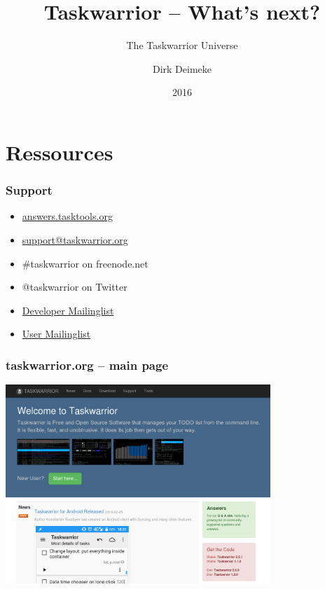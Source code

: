 \documentclass[t,handout]{beamer}
\title{Taskwarrior -- What's next?}
\subtitle{The Taskwarrior Universe}
\author[Deimeke, Dirk]{Dirk Deimeke}
\institute[Taskwarrior Academy]{Taskwarrior Academy}
\date{2016}
\begin{document}
\begin{frame} %
	\titlepage
\end{frame}



\section{Ressources}

\begin{frame}\frametitle{Support}
    \begin{itemize}
        \item \href{https://answers.tasktools.org/}{answers.tasktools.org}
        \item \href{mailto:support@taskwarrior.org}{support@taskwarrior.org}
        \item \#taskwarrior on freenode.net
        \item @taskwarrior on Twitter
        \item \href{https://groups.google.com/forum/\#!forum/taskwarrior-dev}{Developer Mailinglist}
        \item \href{https://groups.google.com/forum/\#!forum/taskwarrior-user}{User Mailinglist}
    \end{itemize}
\end{frame}

\begin{frame}\frametitle{taskwarrior.org -- main page}
    \begin{center}
        \href{http://taskwarrior.org}{\includegraphics[width=10cm,height=7.5cm]{taskwarrior-org.png}}
    \end{center}
\end{frame}
\end{document}

